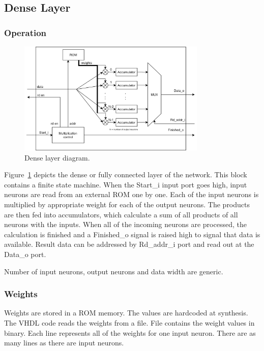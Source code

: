 \subsection{Dense Layer}
\label{sec:hw-fully-connected}

\subsubsection{Operation}
\begin{figure}[h]
	\centering
	\includegraphics[width=0.8\textwidth]{img/blockDiagramDense.png}
	\caption[Dense layer diagram]{Dense layer diagram.}
	\label{fig:denseLayerBlockDiagram}
\end{figure}

Figure~\ref{fig:denseLayerBlockDiagram} depicts the dense or fully connected layer of the network. This block contains a finite state machine. When the Start\_i input port goes high, input neurons are read from an external ROM one by one. Each of the input neurons is multiplied by appropriate weight for each of the output neurons. The products are then fed into accumulators, which calculate a sum of all products of all neurons with the inputs. When all of the incoming neurons are processed, the calculation is finished and a Finished\_o signal is raised high to signal that data is available. Result data can be addressed by Rd\_addr\_i port and read out at the Data\_o port.

Number of input neurons, output neurons and data width are generic.

\subsubsection{Weights}

Weights are stored in a ROM memory. The values are hardcoded at synthesis. The VHDL code reads the weights from a file. File contains the weight values in binary. Each line represents all of the weights for one input neuron. There are as many lines as there are input neurons.

